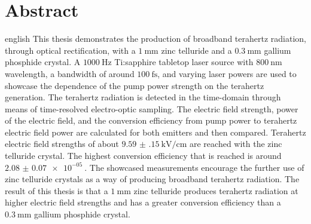 \thispagestyle{plain}

\section*{Abstract}
\begin{foreignlanguage}{english}
This thesis demonstrates the production of broadband terahertz radiation, through optical rectification, with a $\SI{1}{\milli\meter}$ zinc telluride and a $\SI{0.3}{\milli\meter}$ gallium phosphide crystal.
A $\SI{1000}{\hertz}$ Ti:sapphire tabletop laser source with $\SI{800}{\nano\meter}$ wavelength, a bandwidth of around $\SI{100}{\femto\second}$, and varying laser powers are used to showcase the dependence of the pump power strength on the terahertz generation.
The terahertz radiation is detected in the time-domain through means of time-resolved electro-optic sampling.
The electric field strength, power of the electric field, and the conversion efficiency from pump power to terahertz electric field power are calculated for both emitters and then compared.
Terahertz electric field strengths of about $\SI{9.59(15)}{\kilo\V\per\centi\meter}$ are reached with the zinc telluride crystal.
The highest conversion efficiency that is reached is around $\SI{2.08(7)e-05}{}$.
The showcased measurements encourage the further use of zinc telluride crystals as a way of producing broadband terahertz radiation.
The result of this thesis is that a $\SI{1}{\milli\meter}$ zinc telluride produces terahertz radiation at higher electric field strengths and has a greater conversion efficiency than a $\SI{0.3}{\milli\meter}$ gallium phosphide crystal. 
\end{foreignlanguage}
